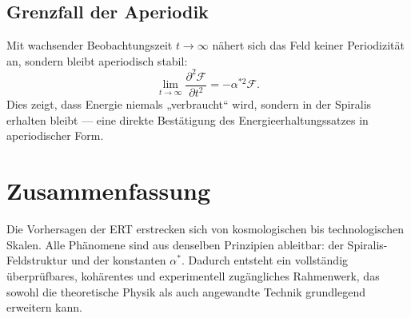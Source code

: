 \subsection{Grenzfall der Aperiodik}
Mit wachsender Beobachtungszeit \(t \rightarrow \infty\) nähert sich das Feld keiner Periodizität an, 
sondern bleibt aperiodisch stabil:
\[
\lim_{t \to \infty} \frac{\partial^2 \mathcal{F}}{\partial t^2} = -\alpha^{*2} \mathcal{F}.
\]
Dies zeigt, dass Energie niemals „verbraucht“ wird, sondern in der Spiralis erhalten bleibt — 
eine direkte Bestätigung des Energieerhaltungssatzes in aperiodischer Form.

\section{Zusammenfassung}
\label{sec:zusammenfassung8}
Die Vorhersagen der \acrshort{ERT} erstrecken sich von kosmologischen bis technologischen Skalen. 
Alle Phänomene sind aus denselben Prinzipien ableitbar: der Spiralis-Feldstruktur und der konstanten \(\alpha^*\). 
Dadurch entsteht ein vollständig überprüfbares, kohärentes und experimentell zugängliches Rahmenwerk, 
das sowohl die theoretische Physik als auch angewandte Technik grundlegend erweitern kann.
